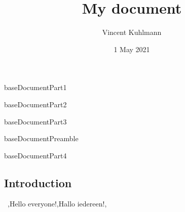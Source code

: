 \begin{saveblock}{baseDocumentPart1}
\end{saveblock}

\begin{saveblock}{baseDocumentPart2}
    \begin{highlightblock}[linewidth=0.5\textwidth,gobble=8,frame=none]
        \usepackage[utf8]{inputenc}

    \end{highlightblock}
\end{saveblock}

\begin{saveblock}{baseDocumentPart3}
    \begin{highlightblock}[linewidth=0.5\textwidth,gobble=8,frame=none]
        \title{My document}
        \author{Vincent Kuhlmann}
        \date{1 May 2021}
    \end{highlightblock}
\end{saveblock}

\begin{saveblock}{baseDocumentPreamble}
\end{saveblock}

\begin{saveblock}{baseDocumentPart4}
    \begin{highlightblock}[linewidth=0.5\textwidth,gobble=8,frame=b]
        
        \maketitle
        \section{Introduction}

        ~\lang,Hello everyone!,Hallo iedereen!,~
        
    \end{highlightblock}
\end{saveblock}

